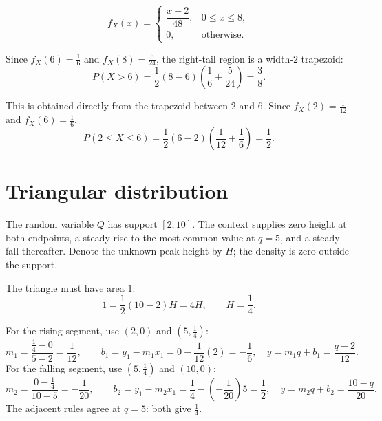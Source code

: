 	\[
	f_X(x)=\begin{cases}\dfrac{x+2}{48},&0\le x\le8,\\[1mm]0,&\text{otherwise.}\end{cases}
	\]
	
	Since $f_X(6)=\frac16$ and $f_X(8)=\frac5{24}$, the right-tail region is a
	width-$2$ trapezoid:
	\[
	P(X>6)=\frac12(8-6)\left(\frac16+\frac5{24}\right)=\frac38.
	\]
	
	This is obtained directly from the trapezoid between $2$ and $6$.  Since
	$f_X(2)=\frac1{12}$ and $f_X(6)=\frac16$,
	\[
	P(2\le X\le6)=\frac12(6-2)\left(\frac1{12}+\frac16\right)=\frac12.
	\]
	
	
	\section{Triangular distribution}
	
	The random variable $Q$ has support $[2,10]$.  The context supplies zero
	height at both endpoints, a steady rise to the most common value at $q=5$,
	and a steady fall thereafter.  Denote the unknown peak height by $H$; the
	density is zero outside the support.
	
	The triangle must have area $1$:
	\[
	1=\frac12(10-2)H=4H,\qquad H=\frac14.
	\]
	
	For the rising segment, use $(2,0)$ and $(5,\frac14)$:
	\[
	m_1=\frac{\frac14-0}{5-2}=\frac1{12},\qquad
	b_1=y_1-m_1x_1=0-\frac1{12}(2)=-\frac16,
	\quad y=m_1q+b_1=\frac{q-2}{12}.
	\]
	For the falling segment, use $(5,\frac14)$ and $(10,0)$:
	\[
	m_2=\frac{0-\frac14}{10-5}=-\frac1{20},\qquad
	b_2=y_1-m_2x_1=\frac14-\left(-\frac1{20}\right)5=\frac12,
	\quad y=m_2q+b_2=\frac{10-q}{20}.
	\]
	The adjacent rules agree at $q=5$: both give $\frac14$.
	
